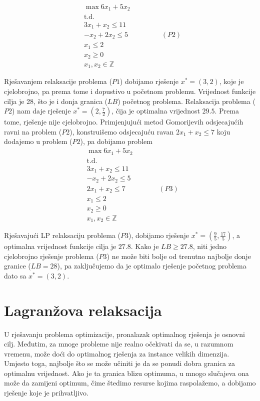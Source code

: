 \documentclass[b5paper, utf8, 11pt, colorlinks]{book}
\theoremstyle{definition}
\begin{document}
\begin{align*}
    &\max 6 x_1 + 5 x_2 \\
      &  \mbox{t.d. } \\
    & 3x_1 + x_2 \leq 11 \\
    & - x_2 + 2 x_2 \leq 5 \hspace{2cm} (P2) \\
    & x_1  \leq 2 \\
    & x_2 \geq 0 \\
    & x_1, x_2 \in \mathbb{Z}
\end{align*}

Rješavanjem relaksacije problema ($P1$) dobijamo rješenje $x^*=(3,2)$, koje je cjelobrojno, pa prema tome i dopustivo u početnom problemu. Vrijednost funkcije cilja je 28, što je i donja granica ($LB$) početnog problema. Relaksacija problema ($P2$) nam daje rješenje $x^*=(2, \frac{7}{2})$, čija je optimalna vrijednost $29.5$.  Prema tome, rješenje nije cjelobrojno. Primjenjujući metod Gomorijevih odsjecajućih ravni na problem ($P2$), konstruišemo odsjecajuću ravan $2x_1 + x_2 \leq 7$ koju dodajemo u problem ($P2$), pa dobijamo problem 
\begin{align*}
    &\max 6 x_1 + 5 x_2 \\
    & \mbox{t.d. } \\
    & 3x_1 + x_2 \leq 11 \\
    & - x_2 + 2 x_2 \leq 5  \\
    & 2x_1 + x_2 \leq 7 \hspace{2cm} (P3)\\ 
    & x_1  \leq 2 \\
    & x_2 \geq 0 \\
    & x_1, x_2 \in \mathbb{Z}
\end{align*}

Rješavajući LP relaksaciju problema ($P3$), dobijamo rješenje $x^*=(\frac{9}{5}, \frac{17}{5})$, a  optimalna vrijednost funkcije cilja je $27.8$. Kako je $LB \geq 27.8$, niti jedno cjelobrojno rješenje problema ($P3$) ne može biti bolje od trenutno najbolje donje granice ($LB=28$), pa zaključujemo da je optimalo rješenje početnog problema dato sa $x^*=(3,2)$. 

\section{Lagranžova relaksacija}
U rješavanju problema optimizacije, pronalazak optimalnog rješenja je osnovni cilj. Međutim, za mnoge probleme nije realno očekivati da se, u razumnom vremenu, može doći do optimalnog rješenja za instance velikih dimenzija. Umjesto toga, najbolje što se može učiniti je da se ponudi dobra  granica za optimalnu vrijednost. Ako je ta granica blizu optimuma, u mnogo slučajeva ona može da zamijeni optimum, čime štedimo resurse kojima raspolažemo, a dobijamo rješenje koje je prihvatljivo.  
\end{document}
